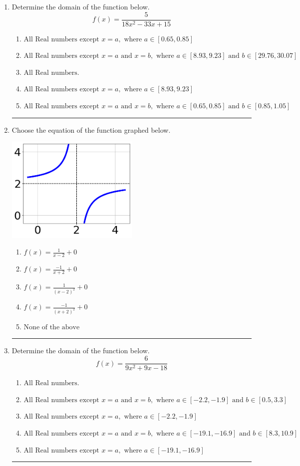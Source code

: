 \documentclass[14pt]{extbook}
\newcommand{\litem}[1]{\item#1\hspace*{-1cm}\rule{\textwidth}{0.4pt}}
\begin{document}
\begin{enumerate}
{\begin{enumerate}[label=\Alph*.]
\end{enumerate} }
\litem{
Determine the domain of the function below.\[ f(x) = \frac{5}{18x^{2} -33 x + 15} \]\begin{enumerate}[label=\Alph*.]
\item \( \text{All Real numbers except } x = a, \text{ where } a \in [0.65, 0.85] \)
\item \( \text{All Real numbers except } x = a \text{ and } x = b, \text{ where } a \in [8.93, 9.23] \text{ and } b \in [29.76, 30.07] \)
\item \( \text{All Real numbers.} \)
\item \( \text{All Real numbers except } x = a, \text{ where } a \in [8.93, 9.23] \)
\item \( \text{All Real numbers except } x = a \text{ and } x = b, \text{ where } a \in [0.65, 0.85] \text{ and } b \in [0.85, 1.05] \)

\end{enumerate} }
\litem{
Choose the equation of the function graphed below.
\begin{center}
    \includegraphics[width=0.5\textwidth]{../Figures/rationalGraphToEquationB.png}
\end{center}
\begin{enumerate}[label=\Alph*.]
\item \( f(x) = \frac{1}{x - 2} + 0 \)
\item \( f(x) = \frac{-1}{x + 2} + 0 \)
\item \( f(x) = \frac{1}{(x - 2)^2} + 0 \)
\item \( f(x) = \frac{-1}{(x + 2)^2} + 0 \)
\item \( \text{None of the above} \)

\end{enumerate} }
\litem{
Determine the domain of the function below.\[ f(x) = \frac{6}{9x^{2} +9 x -18} \]\begin{enumerate}[label=\Alph*.]
\item \( \text{All Real numbers.} \)
\item \( \text{All Real numbers except } x = a \text{ and } x = b, \text{ where } a \in [-2.2, -1.9] \text{ and } b \in [0.5, 3.3] \)
\item \( \text{All Real numbers except } x = a, \text{ where } a \in [-2.2, -1.9] \)
\item \( \text{All Real numbers except } x = a \text{ and } x = b, \text{ where } a \in [-19.1, -16.9] \text{ and } b \in [8.3, 10.9] \)
\item \( \text{All Real numbers except } x = a, \text{ where } a \in [-19.1, -16.9] \)


\end{enumerate}}
\end{enumerate}
\end{document}
